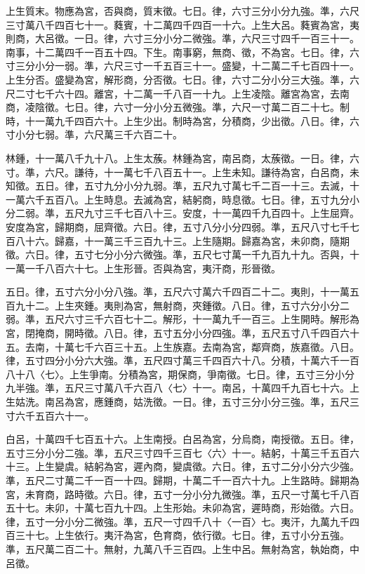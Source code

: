 \begin{pinyinscope}
上生質末。物應為宮，否與商，質末徵。七日。律，六寸三分小分九強。準，六尺三寸萬八千四百七十一。蕤賓，十二萬四千四百一十六。上生大呂。蕤賓為宮，夷則商，大呂徵。一日。律，六寸三分小分二微強。準，六尺三寸四千一百三十一。南事，十二萬四千一百五十四。下生。南事窮，無商、徵，不為宮。七日。律，六寸三分小分一弱。準，六尺三寸一千五百三十一。盛變，十二萬二千七百四十一。上生分否。盛變為宮，解形商，分否徵。七日。律，六寸二分小分三大強。準，六尺二寸七千六十四。離宮，十二萬一千八百一十九。上生凌陰。離宮為宮，去南商，凌陰徵。七日。律，六寸一分小分五微強。準，六尺一寸萬二百二十七。制時，十一萬九千四百六十。上生少出。制時為宮，分積商，少出徵。八日。律，六寸小分七弱。準，六尺萬三千六百二十。

林鍾，十一萬八千九十八。上生太蔟。林鍾為宮，南呂商，太蔟徵。一日。律，六寸。準，六尺。謙待，十一萬七千八百五十一。上生未知。謙待為宮，白呂商，未知徵。五日。律，五寸九分小分九弱。準，五尺九寸萬七千二百一十三。去滅，十一萬六千五百八。上生時息。去滅為宮，結躬商，時息徵。七日。律，五寸九分小分二弱。準，五尺九寸三千七百八十三。安度，十一萬四千九百四十。上生屈齊。安度為宮，歸期商，屈齊徵。六日。律，五寸八分小分四弱。準，五尺八寸七千七百八十六。歸嘉，十一萬三千三百九十三。上生隨期。歸嘉為宮，未卯商，隨期徵。六日。律，五寸七分小分六微強。準，五尺七寸萬一千九百九十九。否與，十一萬一千八百六十七。上生形晉。否與為宮，夷汗商，形晉徵。

五日。律，五寸六分小分八強。準，五尺六寸萬六千四百二十二。夷則，十一萬五百九十二。上生夾鍾。夷則為宮，無射商，夾鍾徵。八日。律，五寸六分小分二弱。準，五尺六寸三千六百七十二。解形，十一萬九千一百三。上生開時。解形為宮，閉掩商，開時徵。八日。律，五寸五分小分四強。準，五尺五寸八千四百六十五。去南，十萬七千六百三十五。上生族嘉。去南為宮，鄰齊商，族嘉徵。八日。律，五寸四分小分六大強。準，五尺四寸萬三千四百六十八。分積，十萬六千一百八十八〈七〉。上生爭南。分積為宮，期保商，爭南徵。七日。律，五寸三分小分九半強。準，五尺三寸萬八千六百八〈七〉十一。南呂，十萬四千九百七十六。上生姑洗。南呂為宮，應鍾商，姑洗徵。一日。律，五寸三分小分三強。準，五尺三寸六千五百六十一。

白呂，十萬四千七百五十六。上生南授。白呂為宮，分烏商，南授徵。五日。律，五寸三分小分二強。準，五尺三寸四千三百七〈六〉十一。結躬，十萬三千五百六十三。上生變虞。結躬為宮，遲內商，變虞徵。六日。律，五寸二分小分六少強。準，五尺二寸萬二千一百一十四。歸期，十萬二千一百六十九。上生路時。歸期為宮，未育商，路時徵。六日。律，五寸一分小分九微強。準，五尺一寸萬七千八百五十七。未卯，十萬七百九十四。上生形始。未卯為宮，遲時商，形始徵。六日。律，五寸一分小分二微強。準，五尺一寸四千八十〈一百〉七。夷汗，九萬九千四百三十七。上生依行。夷汗為宮，色育商，依行徵。七日。律，五寸小分五強。準，五尺萬二百二十。無射，九萬八千三百四。上生中呂。無射為宮，執始商，中呂徵。


\end{pinyinscope}
